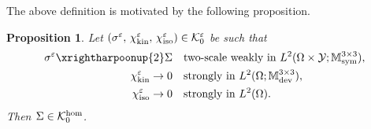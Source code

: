\documentclass[reqno,10pt]{amsart}
\numberwithin{equation}{section}
\newtheorem{proposition}[theorem]{Proposition}
\theoremstyle{remark}
\newcommand{\calK}{\mathcal{K}}
\newcommand{\M}{\mathbb{M}}
\newcommand{\calY}{\mathcal{Y}}
\DeclareMathOperator{\dev}{dev}
\DeclareMathOperator{\sym}{sym}
\newcommand{\strong}{\to}
\newcommand{\weaktwoscale}{\xrightharpoonup{2}}
\newcommand{\eps}{\varepsilon}
\newcommand{\chikin}{\chi_{\rm kin}}
\newcommand{\chiiso}{\chi_{\rm iso}}
\begin{document}
The above definition is motivated by the following proposition.

\begin{proposition} \label{two-scale weak limit of admissible stress - regime zero}
Let $(\sigma^\eps,\, \chikin^\eps,\, \chiiso^\eps) \in \calK^\eps_{0}$ be such that
\begin{align*}
	\sigma^\eps \weaktwoscale \Sigma & \quad \text{two-scale weakly in $L^2(\Omega \times \calY;\M^{3 \times 3}_{\sym})$},
	\\ \chikin^\eps \strong 0 & \quad \text{strongly in $L^2(\Omega;\M^{3 \times 3}_{\dev})$},
	\\ \chiiso^\eps \strong 0 & \quad \text{strongly in $L^2(\Omega)$}.
\end{align*}
Then $\Sigma \in \calK^{\rm hom}_{0}$.
\end{proposition}
\end{document}
